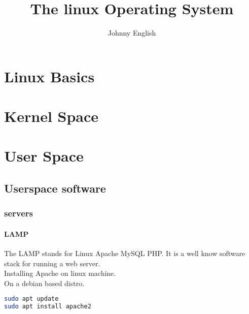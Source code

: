 \documentclass{book}
\title{The linux Operating System}
\author{Johnny English}
\begin{document}
\maketitle
\tableofcontents


\part{Linux Basics}

\part{Kernel Space}

\part{User Space}

\chapter{Userspace software}
\section{servers}
\subsection{LAMP}
The LAMP stands for Linux Apache MySQL PHP. It is a well know software stack for running a web server. \\
Installing Apache on linux machine.\\
On a debian based distro.
\begin{lstlisting}[language=bash]
sudo apt update
sudo apt install apache2
\end{lstlisting}
\end{document}
